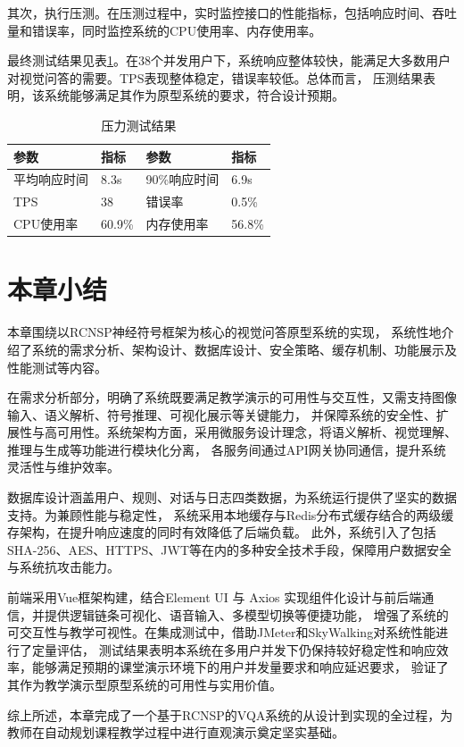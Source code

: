 其次，执行压测。在压测过程中，实时监控接口的性能指标，包括响应时间、吞吐量和错误率，同时监控系统的CPU使用率、内存使用率。

最终测试结果见表\ref{tab:test_result}。在38个并发用户下，系统响应整体较快，能满足大多数用户对视觉问答的需要。TPS表现整体稳定，错误率较低。总体而言，
压测结果表明，该系统能够满足其作为原型系统的要求，符合设计预期。
\begin{table}[h]
    \centering
    \renewcommand{\arraystretch}{1.3} %
    \begin{tabular}{|l|l|l|l|}
        \hline
        \textbf{参数} & \textbf{指标} & \textbf{参数} & \textbf{指标} \\
        \hline
        平均响应时间 & 8.3s & 90\%响应时间 & 6.9s \\
        \hline
        TPS & 38 & 错误率 & 0.5\% \\
        \hline
        CPU使用率 & 60.9\% & 内存使用率 & 56.8\% \\
        \hline
    \end{tabular}
    \caption{压力测试结果}
    \label{tab:test_result}
\end{table}
\section{本章小结}
本章围绕以RCNSP神经符号框架为核心的视觉问答原型系统的实现，
系统性地介绍了系统的需求分析、架构设计、数据库设计、安全策略、缓存机制、功能展示及性能测试等内容。

在需求分析部分，明确了系统既要满足教学演示的可用性与交互性，又需支持图像输入、语义解析、符号推理、可视化展示等关键能力，
并保障系统的安全性、扩展性与高可用性。系统架构方面，采用微服务设计理念，将语义解析、视觉理解、推理与生成等功能进行模块化分离，
各服务间通过API网关协同通信，提升系统灵活性与维护效率。

数据库设计涵盖用户、规则、对话与日志四类数据，为系统运行提供了坚实的数据支持。为兼顾性能与稳定性，
系统采用本地缓存与Redis分布式缓存结合的两级缓存架构，在提升响应速度的同时有效降低了后端负载。
此外，系统引入了包括SHA-256、AES、HTTPS、JWT等在内的多种安全技术手段，保障用户数据安全与系统抗攻击能力。

前端采用Vue框架构建，结合Element UI 与 Axios 实现组件化设计与前后端通信，并提供逻辑链条可视化、语音输入、多模型切换等便捷功能，
增强了系统的可交互性与教学可视性。在集成测试中，借助JMeter和SkyWalking对系统性能进行了定量评估，
测试结果表明本系统在多用户并发下仍保持较好稳定性和响应效率，能够满足预期的课堂演示环境下的用户并发量要求和响应延迟要求，
验证了其作为教学演示型原型系统的可用性与实用价值。

综上所述，本章完成了一个基于RCNSP的VQA系统的从设计到实现的全过程，为教师在自动规划课程教学过程中进行直观演示奠定坚实基础。